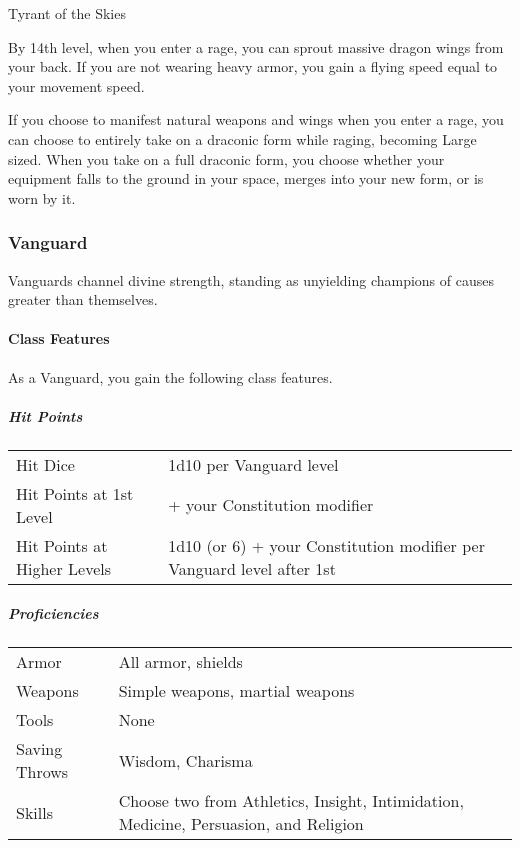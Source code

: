 Tyrant of the Skies

By 14th level, when you enter a rage, you can sprout massive dragon
wings from your back. If you are not wearing heavy armor, you gain a
flying speed equal to your movement speed.

If you choose to manifest natural weapons and wings when you enter a
rage, you can choose to entirely take on a draconic form while raging,
becoming Large sized. When you take on a full draconic form, you choose
whether your equipment falls to the ground in your space, merges into
your new form, or is worn by it.

\subsubsection{Vanguard}\label{vanguard-class}

Vanguards channel divine strength, standing as unyielding champions of
causes greater than themselves.

\paragraph{Class Features}\label{_class_features_3}

As a Vanguard, you gain the following class features.

\subparagraph{Hit Points}\label{_hit_points_3}

\begin{longtable}[]{@{}
  >{\raggedright\arraybackslash}p{}
  >{\raggedright\arraybackslash}p{}@{}}
\toprule\noalign{}
\endhead
\bottomrule\noalign{}
\endlastfoot
Hit Dice & 1d10 per Vanguard level \\
Hit Points at 1st Level & 10 + your Constitution modifier \\
Hit Points at Higher Levels & 1d10 (or 6) + your Constitution modifier
per Vanguard level after 1st \\
\end{longtable}

\subparagraph{Proficiencies}\label{_proficiencies_3}

\begin{longtable}[]{@{}
  >{\raggedright\arraybackslash}p{}
  >{\raggedright\arraybackslash}p{}@{}}
\toprule\noalign{}
\endhead
\bottomrule\noalign{}
\endlastfoot
Armor & All armor, shields \\
Weapons & Simple weapons, martial weapons \\
Tools & None \\
Saving Throws & Wisdom, Charisma \\
Skills & Choose two from Athletics, Insight, Intimidation, Medicine,
Persuasion, and Religion \\
\end{longtable}

